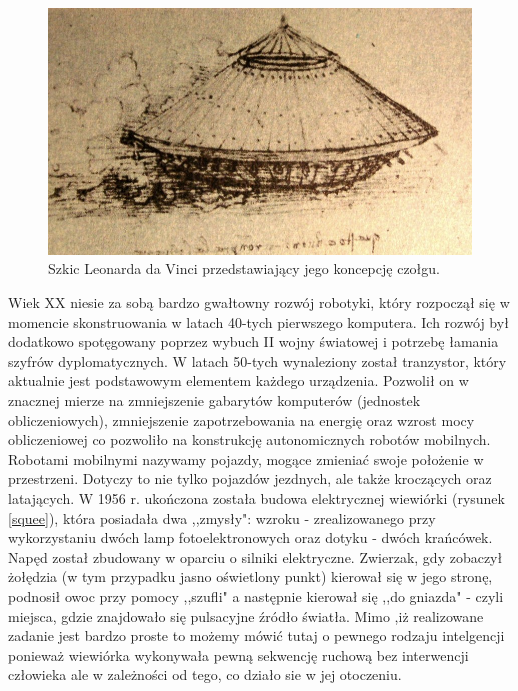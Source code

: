  \begin{figure}[H]
    \begin{center}
      \includegraphics[scale=0.25]{imgs/Leonardo_tank.jpg}
 	\caption[Czołg Leonarda da Vinci]{\small{Szkic Leonarda da Vinci przedstawiający jego koncepcję czołgu.}\footnotemark}
	\label{czolg_leon}
    \end{center}
  \end{figure}
Wiek XX niesie za sobą bardzo gwałtowny rozwój robotyki, który rozpoczął się w momencie skonstruowania w latach 40-tych pierwszego komputera. Ich rozwój był dodatkowo spotęgowany poprzez wybuch II wojny światowej i potrzebę łamania szyfrów dyplomatycznych.
W latach 50-tych wynaleziony został tranzystor, który aktualnie jest podstawowym elementem każdego urządzenia. Pozwolił on w znacznej mierze na zmniejszenie gabarytów komputerów (jednostek obliczeniowych), zmniejszenie zapotrzebowania na energię oraz wzrost mocy obliczeniowej co pozwoliło na konstrukcję autonomicznych robotów mobilnych.
Robotami mobilnymi nazywamy pojazdy, mogące zmieniać swoje położenie w przestrzeni. Dotyczy to nie tylko pojazdów jezdnych, ale także kroczących oraz latających. 
W 1956 r. ukończona została budowa elektrycznej wiewiórki\cite{robot_squee} (rysunek \ref{squee}), która posiadała dwa ,,zmysły": wzroku - zrealizowanego przy wykorzystaniu dwóch lamp fotoelektronowych oraz dotyku - dwóch krańcówek.  Napęd został zbudowany w oparciu o silniki elektryczne. Zwierzak, gdy zobaczył żołędzia (w tym przypadku jasno oświetlony punkt) kierował się w jego stronę, podnosił owoc przy pomocy ,,szufli" a następnie kierował się ,,do gniazda" - czyli miejsca, gdzie znajdowało się pulsacyjne źródło światła. Mimo ,iż realizowane zadanie jest bardzo proste to możemy mówić tutaj o pewnego rodzaju intelgencji ponieważ wiewiórka wykonywała pewną sekwencję ruchową bez interwencji człowieka ale w zależności od tego, co działo sie w jej otoczeniu.

